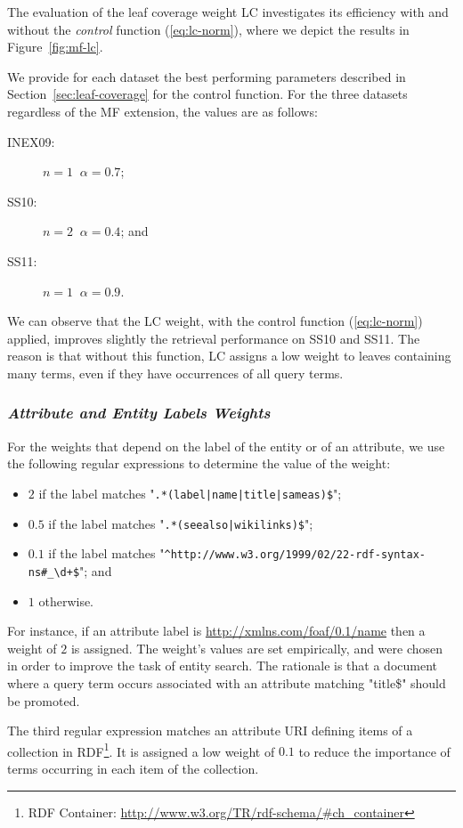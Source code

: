 The evaluation of the leaf coverage weight LC investigates its efficiency with and without the \emph{control} function (\ref{eq:lc-norm}), where we depict the results in Figure~\ref{fig:mf-lc}.

We provide for each dataset the best performing parameters described in Section~\ref{sec:leaf-coverage} for the control function. For the three datasets regardless of the MF extension, the values are as follows:
\begin{description}
	\item[INEX09:] $n=1\;\;\alpha=0.7$;
	\item[SS10:] $n=2\;\;\alpha=0.4$; and
	\item[SS11:] $n=1\;\;\alpha=0.9$.
\end{description}
We can observe that the LC weight, with the control function (\ref{eq:lc-norm}) applied, improves slightly the retrieval performance on SS10 and SS11. The reason is that without this function, LC assigns a low weight to leaves containing many terms, even if they have occurrences of all query terms.

\subsubsection{\emph{Attribute and Entity Labels Weights}}
\label{sec:ael-weight-effect}

For the weights that depend on the label of the entity or of an attribute, we use the following regular expressions to determine the value of the weight:
\begin{itemize}
	\item $2$ if the label matches "\verb/.*(label|name|title|sameas)$/";
	\item $0.5$ if the label matches "\verb/.*(seealso|wikilinks)$/";
	\item $0.1$ if the label matches "\verb|^http://www.w3.org/1999/02/22-rdf-syntax-ns#_\d+$|"; and
	\item $1$ otherwise.
\end{itemize}
For instance, if an attribute label is \url{http://xmlns.com/foaf/0.1/name} then a weight of $2$ is assigned. The weight's values are set empirically, and were chosen in order to improve the task of entity search. The rationale is that a document where a query term occurs associated with an attribute matching "title\$" should be promoted.

The third regular expression matches an attribute URI defining items of a collection in RDF\footnote{RDF Container: \url{http://www.w3.org/TR/rdf-schema/\#ch\_container}}. It is assigned a low weight of $0.1$ to reduce the importance of terms occurring in each item of the collection.\\

